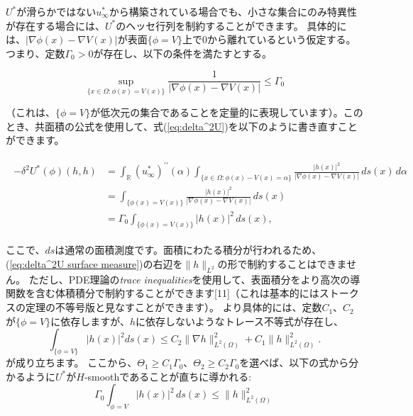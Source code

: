 \documentclass{jsarticle}
\theoremstyle{definition}
\begin{document}
\(U^*\)が滑らかではない\(u^*_\infty\)から構築されている場合でも、小さな集合にのみ特異性が存在する場合には、\(U^*\)のヘッセ行列を制約することができます。
具体的には、\(| \nabla \phi(x) - \nabla V(x) |\)が表面\(\{\phi = V\}\)上で$0$から離れているという仮定する。
つまり、定数\(\Gamma_0 > 0\)が存在し、以下の条件を満たすとする。

\[
    \sup_{\{x \in \Omega: \phi(x) = V(x)\}} \frac{1}{|\nabla \phi(x) - \nabla V(x)|} \leq \Gamma_0
\]

（これは、\(\{\phi = V\}\)が低次元の集合であることを定量的に表現しています）。このとき、共面積の公式を使用して、式(\ref{eq:delta^2U})を以下のように書き直すことができます。

\begin{align}
    \label{eq:delta^2U surface measure}
    \begin{split}
        -\delta^2 U^*(\phi)(h, h)   &= \int_{\mathbb{R}}(u^*_\infty)^{\prime\prime}(\alpha) \int_{\{x \in \Omega: \phi(x) - V(x) = \alpha\}}  \frac{|h(x)|^2}{|\nabla \phi(x) - \nabla V(x) |} \, ds(x)\, d \alpha \\
                                    &= \int_{\{\phi(x) = V(x)\}} \frac{|h(x)|^2}{|\nabla \phi(x) - \nabla V(x)|} \, ds(x)\\
                                    &= \Gamma_0 \int_{\{\phi(x) = V(x)\}} | h(x) |^2 \, ds(x),
    \end{split}
\end{align}


ここで、\(ds\)は通常の面積測度です。面積にわたる積分が行われるため、(\ref{eq:delta^2U surface measure})の右辺を\(\|h\|_{L^2}\)の形で制約することはできません。
ただし、PDE理論の\textit{trace inequalities}を使用して、表面積分をより高次の導関数を含む体積積分で制約することができます[11]（これは基本的にはストークスの定理の不等号版と見なすことができます）。
より具体的には、定数\(C_1\)、\(C_2\)が\(\{\phi = V\}\)に依存しますが、\(h\)に依存しないようなトレース不等式が存在し、
\[
    \int_{\{\phi = V\}} |h(x)|^2 ds(x) \leq C_2 \| \nabla h \|^2_{L^2(\Omega)} + C_1 \| h \|^2_{L^2(\Omega)}.
\]
が成り立ちます。
ここから、\(\Theta_1 \geq C_1 \Gamma_0\)、\(\Theta_2 \geq C_2 \Gamma_0\)を選べば、以下の式から分かるように\(U^*\)が\(H\)-smoothであることが直ちに導かれる:
\[
    \Gamma_0 \int_{\phi = V} |h(x)|^2 \, ds(x) \leq \|h\|^2_{L^2(\Omega)}
\]

\vspace\baselineskip
\end{document}
